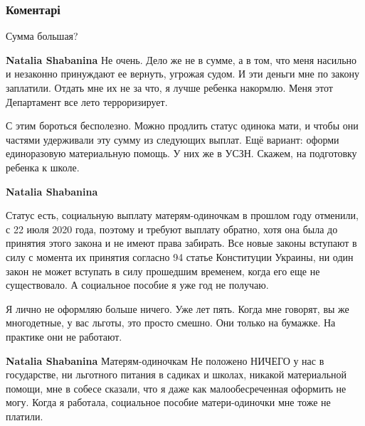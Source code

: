  
 
 
 
 
\subsubsection{Коментарі}

\begin{itemize} %
Сумма большая?

\begin{itemize} %
\textbf{Natalia Shabanina} Не очень. Дело же не в сумме, а в том, что меня насильно и незаконно принуждают ее вернуть, угрожая судом. И эти деньги мне по закону заплатили. Отдать мне их не за что, я лучше ребенка накормлю. Меня этот Департамент все лето терроризирует.


С этим бороться бесполезно. Можно продлить статус одинока мати, и чтобы они
частями удерживали эту сумму из следующих выплат. Ещё вариант: оформи
единоразовую материальную помощь. У них же в УСЗН. Скажем, на подготовку
ребенка к школе.

\textbf{Natalia Shabanina} 

Статус есть, социальную выплату матерям-одиночкам в прошлом году отменили, с 22
июля 2020 года, поэтому и требуют выплату обратно, хотя она была до принятия
этого закона и не имеют права забирать. Все новые законы вступают в силу с
момента их принятия согласно 94 статье Конституции Украины, ни один закон не
может вступать в силу прошедшим временем, когда его еще не существовало. А
социальное пособие я уже год не получаю.


Я лично не оформляю больше ничего. Уже лет пять. Когда мне говорят, вы же
многодетные, у вас льготы, это просто смешно. Они только на бумажке. На
практике они не работают.

\textbf{Natalia Shabanina} Матерям-одиночкам Не положено НИЧЕГО у нас в государстве, ни льготного питания в садиках и школах, никакой материальной помощи, мне в собесе сказали, что я даже как малообесреченная оформить не могу. Когда я работала, социальное пособие матери-одиночки мне тоже не платили.


\end{itemize}
\end{itemize}
